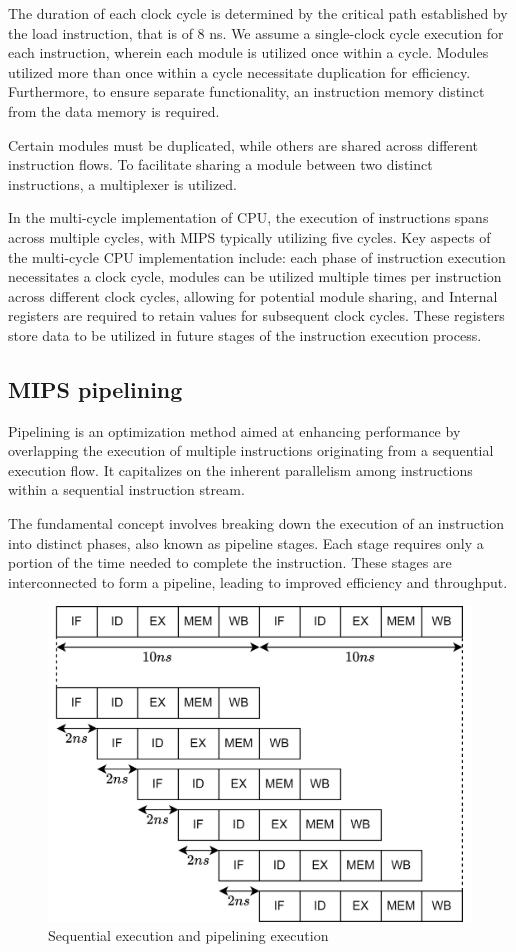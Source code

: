 The duration of each clock cycle is determined by the critical path established by the load instruction, that is of $8$ ns.
We assume a single-clock cycle execution for each instruction, wherein each module is utilized once within a cycle. 
Modules utilized more than once within a cycle necessitate duplication for efficiency. 
Furthermore, to ensure separate functionality, an instruction memory distinct from the data memory is required.

Certain modules must be duplicated, while others are shared across different instruction flows.
To facilitate sharing a module between two distinct instructions, a multiplexer is utilized.

In the multi-cycle implementation of CPU, the execution of instructions spans across multiple cycles, with MIPS typically utilizing five cycles. 
Key aspects of the multi-cycle CPU implementation include: each phase of instruction execution necessitates a clock cycle, modules can be utilized multiple times per instruction across different clock cycles, allowing for potential module sharing, and Internal registers are required to retain values for subsequent clock cycles. 
These registers store data to be utilized in future stages of the instruction execution process.

\subsection{MIPS pipelining}
Pipelining is an optimization method aimed at enhancing performance by overlapping the execution of multiple instructions originating from a sequential execution flow. 
It capitalizes on the inherent parallelism among instructions within a sequential instruction stream.

The fundamental concept involves breaking down the execution of an instruction into distinct phases, also known as pipeline stages. 
Each stage requires only a portion of the time needed to complete the instruction.
These stages are interconnected to form a pipeline, leading to improved efficiency and throughput.
\begin{figure}[H]
    \centering
    \includegraphics[width=0.5\linewidth]{images/exe.png}
    \caption{Sequential execution and pipelining execution}
\end{figure}

